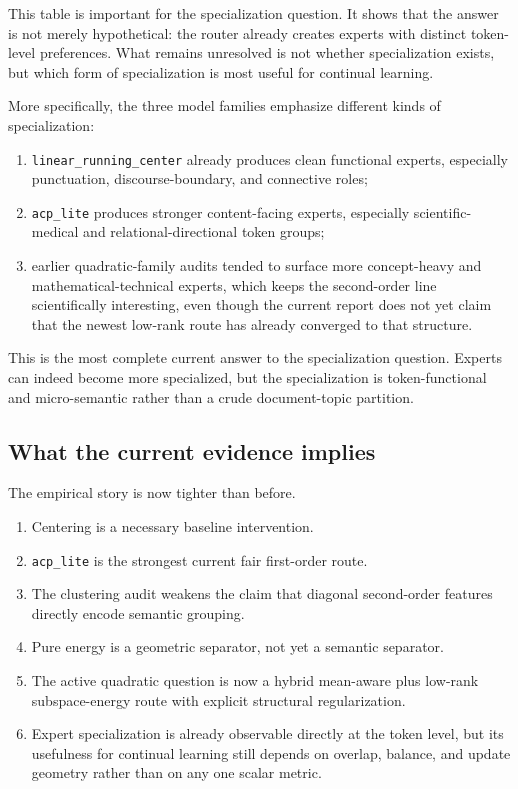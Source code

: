 \documentclass[11pt]{article}
\begin{document}
This table is important for the specialization question. It shows that the answer is not merely hypothetical: the router already creates experts with distinct token-level preferences. What remains unresolved is not whether specialization exists, but which form of specialization is most useful for continual learning.

More specifically, the three model families emphasize different kinds of specialization:
\begin{enumerate}
    \item \texttt{linear\_running\_center} already produces clean functional experts, especially punctuation, discourse-boundary, and connective roles;
    \item \texttt{acp\_lite} produces stronger content-facing experts, especially scientific-medical and relational-directional token groups;
    \item earlier quadratic-family audits tended to surface more concept-heavy and mathematical-technical experts, which keeps the second-order line scientifically interesting, even though the current report does not yet claim that the newest low-rank route has already converged to that structure.
\end{enumerate}

This is the most complete current answer to the specialization question. Experts can indeed become more specialized, but the specialization is token-functional and micro-semantic rather than a crude document-topic partition.

\subsection{What the current evidence implies}

The empirical story is now tighter than before.

\begin{enumerate}
    \item Centering is a necessary baseline intervention.
    \item \texttt{acp\_lite} is the strongest current fair first-order route.
    \item The clustering audit weakens the claim that diagonal second-order features directly encode semantic grouping.
    \item Pure energy is a geometric separator, not yet a semantic separator.
    \item The active quadratic question is now a hybrid mean-aware plus low-rank subspace-energy route with explicit structural regularization.
    \item Expert specialization is already observable directly at the token level, but its usefulness for continual learning still depends on overlap, balance, and update geometry rather than on any one scalar metric.
\end{enumerate}
\end{document}

